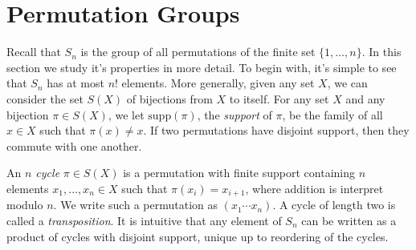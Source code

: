 \section{Permutation Groups}

Recall that $S_n$ is the group of all permutations of the finite set $\{ 1, \dots, n \}$. In this section we study it's properties in more detail. To begin with, it's simple to see that $S_n$ has at most $n!$ elements. More generally, given any set $X$, we can consider the set $S(X)$ of bijections from $X$ to itself. For any set $X$ and any bijection $\pi \in S(X)$, we let $\text{supp}(\pi)$, the \emph{support} of $\pi$, be the family of all $x \in X$ such that $\pi(x) \neq x$. If two permutations have disjoint support, then they commute with one another.

An \emph{$n$ cycle} $\pi \in S(X)$ is a permutation with finite support containing $n$ elements $x_1, \dots, x_n \in X$ such that $\pi(x_i) = x_{i+1}$, where addition is interpret modulo $n$. We write such a permutation as $(x_1 \cdots x_n)$. A cycle of length two is called a \emph{transposition}. It is intuitive that any element of $S_n$ can be written as a product of cycles with disjoint support, unique up to reordering of the cycles.

\begin{comment}

\begin{theorem}
    Every element of $S_n$ can be written as the product of cycles with disjoint support, unique up to reordering.
\end{theorem}

\end{comment}

\begin{comment}
\begin{proof}
    Let $\sigma$ be an arbitrary element of the symmetric group $S_n$, and consider the cyclic group generated by $\sigma$. Consider the set $\{ 1, 2, \dots, n \}$, with $\gen{\sigma}$ acting on the set by the mapping
    \[ \pi k = \pi(k) \]
    in the obvious manner. We obtain disjoint partitions of orbits from this action. We claim that $\pi$ when restricted to this orbit is a cycle, and thus $\pi$ consists of products of cycles from each orbit. Consider an orbit $(\gen{\pi} k)$ for some number $k$ between one and $n$. Every integer in $k$'s orbit can be written $\pi^m(k)$ for some integer $m$. For each integer $l$ in the range, associate it with the smallest positive integer $m$ such that $\pi^m(k) = l$. We obtain an ordering
    \[ (\pi^0(k), \pi^1(k), \pi^2(k), \dots, \pi^n(k)) \]
    such that $\pi^{n+1}(k) = k$. This generates a cycle, and we have shown what was needed.
\end{proof}
\end{comment}

